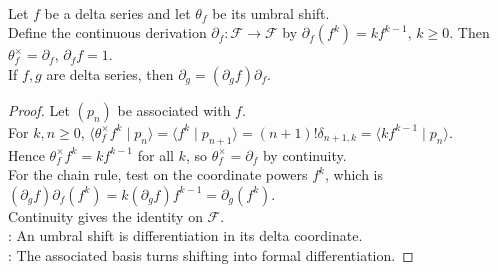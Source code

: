 \begin{theorem} \label{thm:umbral-shift-derivation-chain-rule} \\
Let $f$ be a delta series and let $\theta_f$ be its umbral shift.\\
Define the continuous derivation $\partial_f:\mathscr{F}\to\mathscr{F}$ by $\partial_f(f^k)=kf^{k-1}$, $k\geq0$. Then $\theta_f^\times=\partial_f$, $\partial_f f=1$.\\
If $f,g$ are delta series, then $\partial_g=(\partial_g f)\partial_f$.
\begin{proof}
Let $(p_n)$ be associated with $f$.\\
For $k,n\geq0$, $\langle \theta_f^\times f^k\mid p_n\rangle =\langle f^k\mid p_{n+1}\rangle =(n+1)!\delta_{n+1,k} =\langle kf^{k-1}\mid p_n\rangle$.\\
Hence $\theta_f^\times f^k=kf^{k-1}$ for all $k$, so $\theta_f^\times=\partial_f$ by continuity.\\
For the chain rule, test on the coordinate powers $f^k$, which is $(\partial_g f)\partial_f(f^k) =k(\partial_g f)f^{k-1} =\partial_g(f^k)$.\\
Continuity gives the identity on $\mathscr{F}$.\\
: An umbral shift is differentiation in its delta
coordinate.\\
: The associated basis turns shifting into formal
differentiation.
\end{proof}
\end{theorem}

